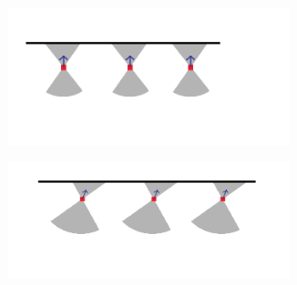 \begin{figure}[!htb]
     \centering
     \begin{subfigure}[b]{0.5\textwidth}
         \centering
         \includegraphics[width=0.9\textwidth]{./images/chapter5/set_one_front.png}
         \label{fig:set_one_front}
     \end{subfigure}%
     \begin{subfigure}[b]{0.5\textwidth}
         \centering
         \includegraphics[width=0.9\textwidth]{./images/chapter5/set_two_front.png}
         \label{fig:set_two_front}
     \end{subfigure}
     \hfill
     

\end{figure}
